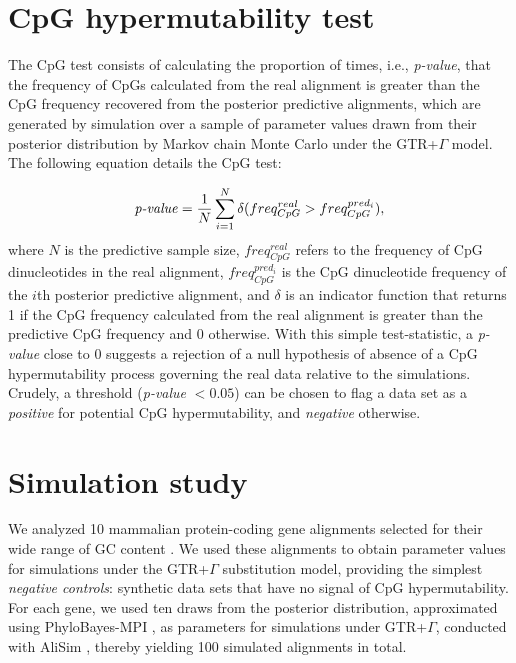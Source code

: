 \documentclass{article}
\begin{document}
\section*{CpG hypermutability test}
The CpG test consists of calculating the proportion of times, i.e., \emph{p-value}, that the frequency of CpGs calculated from the real alignment is greater than the CpG frequency recovered from the posterior predictive alignments, which are generated by simulation over a sample of parameter values drawn from their posterior distribution by Markov chain Monte Carlo under the GTR+$\Gamma$ model.  The following equation details the CpG test:

\begin{equation}\label{test}
 \text{\emph{p-value}} = \frac{1}{N}\sum_{i=1}^{N}\delta(freq_{CpG}^{real}>freq_{CpG}^{pred_{i}}),
\end{equation}
where $N$ is the predictive sample size, $freq_{CpG}^{real}$ refers to the frequency of CpG dinucleotides in the real alignment, $freq_{CpG}^{pred_{i}}$ is the CpG dinucleotide frequency of the $i$th posterior predictive alignment, and $\delta$ is an indicator function that returns 1 if the CpG frequency calculated from the real alignment is greater than the predictive CpG frequency and 0 otherwise.  With this simple test-statistic, a \emph{p-value} close to 0 suggests a rejection of a null hypothesis of absence of a CpG hypermutability process governing the real data relative to the simulations.  Crudely, a threshold (\emph{p-value} $<0.05$) can be chosen to flag a data set as a \emph{positive} for potential CpG hypermutability, and \emph{negative} otherwise.

\section*{Simulation study}
We analyzed 10 mammalian protein-coding gene alignments selected for their wide range of GC content \citep{LaurinLemay2018b}.  We used these alignments to obtain parameter values for simulations under the GTR+$\Gamma$ substitution model, providing the simplest \emph{negative controls}: synthetic data sets that have no signal of CpG hypermutability.  For each gene, we used ten draws from the posterior distribution, approximated using PhyloBayes-MPI \citep{Lartillot2013}, as parameters for simulations under GTR+$\Gamma$, conducted with AliSim \citep{LyTrong2022}, thereby yielding 100 simulated alignments in total.
\end{document}
